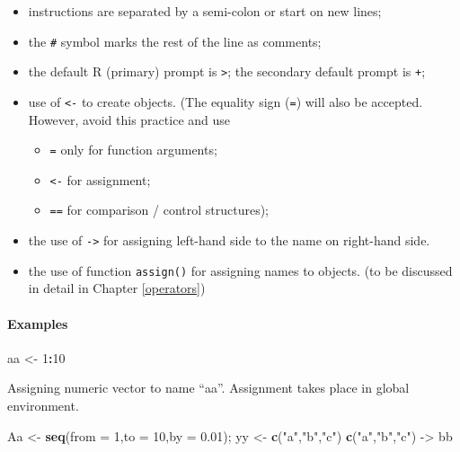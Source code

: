 \documentclass[
]{book}
\newenvironment{Shaded}{\begin{snugshade}}{\end{snugshade}}
\newcommand{\AttributeTok}[1]{\textcolor[rgb]{0.13,0.29,0.53}{#1}}
\newcommand{\DecValTok}[1]{\textcolor[rgb]{0.00,0.00,0.81}{#1}}
\newcommand{\FloatTok}[1]{\textcolor[rgb]{0.00,0.00,0.81}{#1}}
\newcommand{\FunctionTok}[1]{\textcolor[rgb]{0.13,0.29,0.53}{\textbf{#1}}}
\newcommand{\NormalTok}[1]{#1}
\newcommand{\OtherTok}[1]{\textcolor[rgb]{0.56,0.35,0.01}{#1}}
\newcommand{\SpecialCharTok}[1]{\textcolor[rgb]{0.81,0.36,0.00}{\textbf{#1}}}
\newcommand{\StringTok}[1]{\textcolor[rgb]{0.31,0.60,0.02}{#1}}
\providecommand{\tightlist}{%
  \setlength{\itemsep}{0pt}\setlength{\parskip}{0pt}}
\begin{document}
\begin{itemize}
\item
  instructions are separated by a semi-colon or start on new lines;
\item
  the \texttt{\#} symbol marks the rest of the line as comments;
\item
  the default R (primary) prompt is \texttt{\textgreater{}}; the secondary default prompt is \texttt{+};
\item
  use of \texttt{\textless{}-} to create objects. (The equality sign (\texttt{=}) will also be accepted. However, avoid this practice and use

  \begin{itemize}
  \tightlist
  \item
    \texttt{=} only for function arguments;
  \item
    \texttt{\textless{}-} for assignment;
  \item
    \texttt{==} for comparison / control structures);
  \end{itemize}
\item
  the use of \texttt{-\textgreater{}} for assigning left-hand side to the name on right-hand side.
\item
  the use of function \texttt{assign()} for assigning names to objects. (to be discussed in detail in Chapter \ref{operators})
\end{itemize}

\paragraph*{Examples}\label{examples}

\begin{Shaded}
\begin{Highlighting}[]
\NormalTok{aa }\OtherTok{\textless{}{-}} \DecValTok{1}\SpecialCharTok{:}\DecValTok{10}
\end{Highlighting}
\end{Shaded}

Assigning numeric vector to name ``aa''. Assignment takes place in global environment.

\begin{Shaded}
\begin{Highlighting}[]
\NormalTok{Aa }\OtherTok{\textless{}{-}} \FunctionTok{seq}\NormalTok{(}\AttributeTok{from =} \DecValTok{1}\NormalTok{,}\AttributeTok{to =} \DecValTok{10}\NormalTok{,}\AttributeTok{by =} \FloatTok{0.01}\NormalTok{); yy }\OtherTok{\textless{}{-}} \FunctionTok{c}\NormalTok{(}\StringTok{"a"}\NormalTok{,}\StringTok{"b"}\NormalTok{,}\StringTok{"c"}\NormalTok{)}
\FunctionTok{c}\NormalTok{(}\StringTok{"a"}\NormalTok{,}\StringTok{"b"}\NormalTok{,}\StringTok{"c"}\NormalTok{) }\OtherTok{{-}\textgreater{}}\NormalTok{ bb }
\end{Highlighting}
\end{Shaded}
\end{document}
